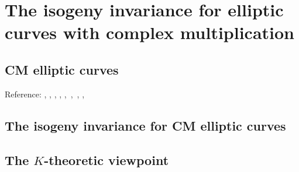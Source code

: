 
\chapter{The isogeny invariance for elliptic curves with complex multiplication}
\label{chap1}

\tab

\section{CM elliptic curves}
Reference: \cite{Hi2013}, \cite{Si2009}, \cite{Si1994}, \cite{Ko1993}, \cite{Kn1992},~\cite{Ca1991},~\cite{Mi2006}, \cite{CVG1999}, \cite{Sh1987}

\newpage
\section{The isogeny invariance for CM elliptic curves}

\newpage
\section{The $K$-theoretic viewpoint}


\endinput

Any text after an \endinput is ignored.
You could put scraps here or things in progress.
